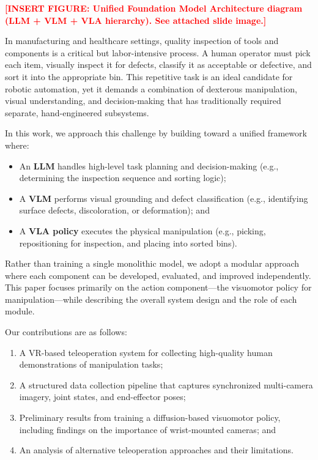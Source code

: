 \documentclass[conference]{IEEEtran}
\newcommand{\placeholder}[1]{\textcolor{red}{\textbf{[#1]}}}
\begin{document}
\placeholder{INSERT FIGURE: Unified Foundation Model Architecture diagram (LLM + VLM + VLA hierarchy). See attached slide image.}

In manufacturing and healthcare settings, quality inspection of tools and components is a critical but labor-intensive process. A human operator must pick each item, visually inspect it for defects, classify it as acceptable or defective, and sort it into the appropriate bin. This repetitive task is an ideal candidate for robotic automation, yet it demands a combination of dexterous manipulation, visual understanding, and decision-making that has traditionally required separate, hand-engineered subsystems.

In this work, we approach this challenge by building toward a unified framework where:
\begin{itemize}
    \item An \textbf{LLM} handles high-level task planning and decision-making (e.g., determining the inspection sequence and sorting logic);
    \item A \textbf{VLM} performs visual grounding and defect classification (e.g., identifying surface defects, discoloration, or deformation); and
    \item A \textbf{VLA policy} executes the physical manipulation (e.g., picking, repositioning for inspection, and placing into sorted bins).
\end{itemize}

Rather than training a single monolithic model, we adopt a modular approach where each component can be developed, evaluated, and improved independently. This paper focuses primarily on the action component---the visuomotor policy for manipulation---while describing the overall system design and the role of each module.

Our contributions are as follows:
\begin{enumerate}
    \item A VR-based teleoperation system for collecting high-quality human demonstrations of manipulation tasks;
    \item A structured data collection pipeline that captures synchronized multi-camera imagery, joint states, and end-effector poses;
    \item Preliminary results from training a diffusion-based visuomotor policy, including findings on the importance of wrist-mounted cameras; and
    \item An analysis of alternative teleoperation approaches and their limitations.
\end{enumerate}
\end{document}
